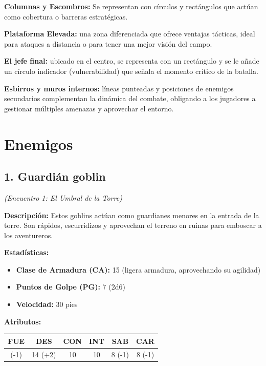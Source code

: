 \documentclass[
  twocolumn]{article}
\providecommand{\tightlist}{%
  \setlength{\itemsep}{0pt}\setlength{\parskip}{0pt}}
\begin{document}
\textbf{Columnas y Escombros:} Se representan con círculos y rectángulos
que actúan como cobertura o barreras estratégicas.

\textbf{Plataforma Elevada:} una zona diferenciada que ofrece ventajas
tácticas, ideal para ataques a distancia o para tener una mejor visión
del campo.

\textbf{El jefe final:} ubicado en el centro, se representa con un
rectángulo y se le añade un círculo indicador (vulnerabilidad) que
señala el momento crítico de la batalla.

\textbf{Esbirros y muros internos:} líneas punteadas y posiciones de
enemigos secundarios complementan la dinámica del combate, obligando a
los jugadores a gestionar múltiples amenazas y aprovechar el entorno.

\section{Enemigos}\label{enemigos-2}

\subsection{1. Guardián goblin}\label{guardiuxe1n-goblin}

\emph{(Encuentro 1: El Umbral de la Torre)}

\textbf{Descripción:} Estos goblins actúan como guardianes menores en la
entrada de la torre. Son rápidos, escurridizos y aprovechan el terreno
en ruinas para emboscar a los aventureros.

\textbf{Estadísticas:}

\begin{itemize}
\tightlist
\item
  \textbf{Clase de Armadura (CA):} 15 (ligera armadura, aprovechando su
  agilidad)
\item
  \textbf{Puntos de Golpe (PG):} 7 (2d6)
\item
  \textbf{Velocidad:} 30 pies
\end{itemize}

\textbf{Atributos:}

\begin{longtable}[]{@{}cccccc@{}}
\toprule\noalign{}
FUE & DES & CON & INT & SAB & CAR \\
\midrule\noalign{}
\endhead
\bottomrule\noalign{}
\endlastfoot
8 (-1) & 14 (+2) & 10 & 10 & 8 (-1) & 8 (-1) \\
\end{longtable}
\end{document}

